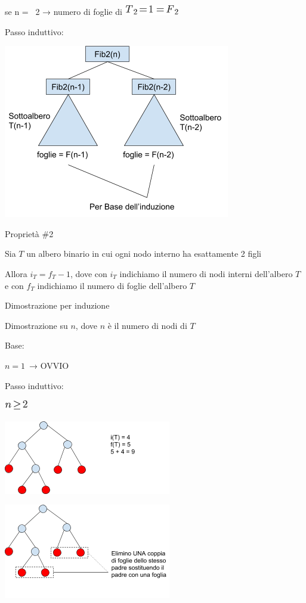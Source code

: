\documentclass{article}
\begin{document}
{se n = ~2 → numero di foglie di }\includegraphics{images/image36.png}

{Passo induttivo:}

{\includegraphics{images/image528.png}}

{Proprietà \#2}

{Sia $T$ un albero binario in cui ogni nodo interno ha esattamente 2 figli}

{Allora $i_T=f_T-1$, dove con $i_T$ indichiamo il numero di nodi interni dell'albero $T$ e con $f_T$ indichiamo il numero di foglie dell'albero $T$}

{Dimostrazione per induzione}

{Dimostrazione su $n$, dove $n$ è il numero di nodi di $T$}

{Base:}

$n=1${~→ OVVIO}

{Passo induttivo:}

\includegraphics{images/image43.png}

{\includegraphics{images/image525.png}}

{\includegraphics{images/image536.png}}
\end{document}
